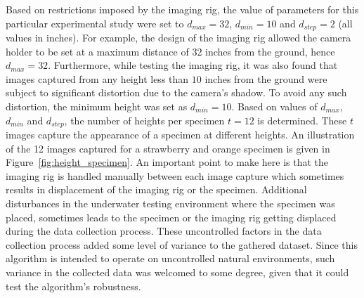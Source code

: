 Based on restrictions imposed by the imaging rig, the value of parameters for this particular experimental study were set to $d_{max}=32$, $d_{min}=10$ and $d_{step}=2$ (all values in inches).
For example, the design of the imaging rig allowed the camera holder to be set at a maximum distance of $32$ inches from the ground, hence $d_{max}=32$. Furthermore, while testing the imaging rig, it was also found that images captured from any height less than $10$ inches from the ground were subject to significant distortion due to the camera's shadow. To avoid any such distortion, the minimum height was set as $d_{min}=10$. Based on values of $d_{max}$, $d_{min}$ and $d_{step}$, the number of heights per specimen $t=12$ is determined.
These $t$ images capture the appearance of a specimen at different heights. An illustration of the 12 images captured for a strawberry and orange specimen is given in Figure~\ref{fig:height_specimen}. An important point to make here is that the imaging rig is handled manually between each image capture which sometimes results in displacement of the imaging rig or the specimen. 
Additional disturbances in the underwater testing environment where the specimen was placed, sometimes leads to the specimen or the imaging rig getting displaced during the data collection process. These uncontrolled factors in the data collection process added some level of variance to the gathered dataset.
Since this algorithm is intended to operate on uncontrolled natural environments, such variance in the collected data was welcomed to some degree, given that it could test the algorithm's robustness.

